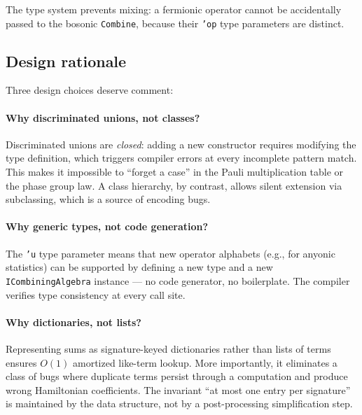 The type system prevents mixing: a fermionic operator cannot be
accidentally passed to the bosonic \texttt{Combine}, because their
\texttt{'op} type parameters are distinct.

\subsection*{Design rationale}

Three design choices deserve comment:

\paragraph{Why discriminated unions, not classes?}
Discriminated unions are \emph{closed}: adding a new constructor
requires modifying the type definition, which triggers compiler
errors at every incomplete pattern match.  This makes it impossible
to ``forget a case'' in the Pauli multiplication table or the phase
group law.  A class hierarchy, by contrast, allows silent extension
via subclassing, which is a source of encoding bugs.

\paragraph{Why generic types, not code generation?}
The \texttt{'u} type parameter means that new operator alphabets
(e.g., for anyonic statistics) can be supported by defining a new
type and a new \texttt{ICombiningAlgebra} instance --- no code
generator, no boilerplate.  The compiler verifies type consistency
at every call site.

\paragraph{Why dictionaries, not lists?}
Representing sums as signature-keyed dictionaries rather than
lists of terms ensures $O(1)$ amortized like-term lookup.  More
importantly, it eliminates a class of bugs where duplicate terms
persist through a computation and produce wrong Hamiltonian
coefficients.  The invariant ``at most one entry per signature''
is maintained by the data structure, not by a post-processing
simplification step.

